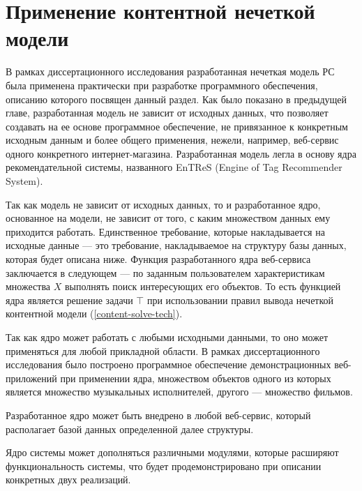 \section{Применение контентной нечеткой модели}
В рамках диссертационного исследования разработанная нечеткая модель
РС была применена практически при разработке программного
обеспечения, описанию которого посвящен данный раздел.
Как было показано в предыдущей главе, разработанная модель не зависит от
исходных данных, что позволяет создавать на ее основе программное
обеспечение, не привязанное к конкретным исходным данным и
более общего применения, нежели, например, веб-сервис одного конкретного
интернет-магазина. Разработанная модель легла в основу
ядра рекомендательной системы, названного EnTReS (Engine of Tag
Recommender System).

Так как модель не зависит от исходных данных, то и разработанное ядро,
основанное на модели, не зависит от того, с каким множеством данных ему приходится работать.
Единственное требование, которые накладывается на исходные данные ---
это требование, накладываемое на структуру базы данных, которая
будет описана ниже. Функция разработанного ядра веб-сервиса заключается
в следующем --- по заданным пользователем характеристикам множества $X$
выполнять поиск интересующих его объектов. То есть функцией ядра является
решение задачи $\top$ при использовании правил вывода нечеткой
контентной модели (\ref{content-solve-tech}).

Так как ядро может работать с любыми исходными данными, то оно может
применяться для любой прикладной области. В рамках диссертационного
исследования было построено программное обеспечение демонстрационных
веб-приложений при применении ядра, множеством объектов
одного из которых является множество музыкальных исполнителей,
другого --- множество фильмов.

Разработанное ядро может быть внедрено в любой веб-сервис, который располагает
базой данных определенной далее структуры.

Ядро системы может дополняться различными модулями, которые расширяют
функциональность системы, что будет продемонстрировано при описании конкретных
двух реализаций.

